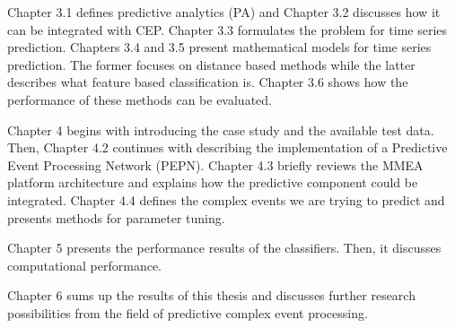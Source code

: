 Chapter 3.1 defines predictive analytics (PA) and Chapter 3.2 discusses how it can be integrated with CEP. Chapter 3.3 formulates the problem for time series prediction. Chapters 3.4 and 3.5 present mathematical models for time series prediction. The former focuses on distance based methods while the latter describes what feature based classification is. Chapter 3.6 shows how the performance of these methods can be evaluated.

Chapter 4 begins with introducing the case study and the available test data. Then, Chapter 4.2 continues with describing the implementation of a Predictive Event Processing Network (PEPN). Chapter 4.3 briefly reviews the MMEA platform architecture and explains how the predictive component could be integrated. Chapter 4.4 defines the complex events we are trying to predict and presents methods for parameter tuning.

Chapter 5 presents the performance results of the classifiers. Then, it discusses computational performance.

Chapter 6 sums up the results of this thesis and discusses further research possibilities from the field of predictive complex event processing.



